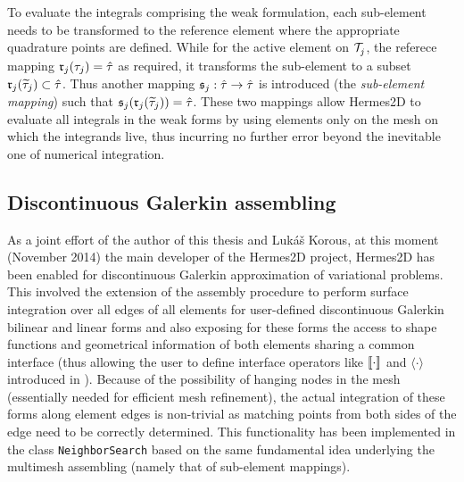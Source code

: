 To evaluate the integrals comprising the weak formulation, each
sub-element needs to be transformed to the reference element where the appropriate quadrature points are defined.
While for the active element on $\mathcal{T}^{}_{j}$, the referece mapping $\mathfrak{r}_j(\tau_j) = \hat{\tau}$ as required, it
transforms the sub-element to a subset $\mathfrak{r}_j(\widetilde{\tau}_j) \subset \hat{\tau}$. Thus another mapping
$\mathfrak{s}_j : \hat{\tau} \to \hat{\tau}$ is introduced (the \textit{sub-element mapping}) such that
$\mathfrak{s}_j(\mathfrak{r}_j(\widetilde{\tau}_j)) = \hat{\tau}$. These two mappings allow Hermes2D to evaluate all
integrals in the weak forms by using elements only on the mesh on which the integrands live, thus incurring no further
error beyond the inevitable one of numerical integration.

\subsection{Discontinuous Galerkin assembling}\label{sec:hermes_dg}
As a joint effort of the author of this thesis and Luk{\' a}{\v s} Korous, at this moment (November 2014) the main
developer of the Hermes2D project, Hermes2D has been enabled for discontinuous Galerkin approximation of
variational problems. This involved the extension of the assembly procedure to
perform surface integration over all edges of all elements for user-defined discontinuous Galerkin bilinear and linear
forms and also exposing for these forms the access to shape functions and geometrical information of both elements sharing a
common interface (thus allowing the user to define interface operators like $\llbracket\cdot\rrbracket$ and $\langle\cdot\rangle$ introduced in
 ). 
 Because of the possibility of hanging nodes in the mesh (essentially needed for efficient mesh
 refinement), the actual integration of these forms along element edges is non-trivial as matching points
 from both sides of the edge need to be correctly determined.  
This functionality has been implemented in the class \lstinline{NeighborSearch} based on the same fundamental idea
underlying the multimesh assembling (namely that of sub-element mappings).

